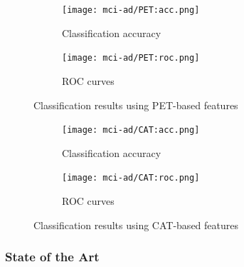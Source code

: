 \documentclass[12pt,a4paper]{article}
\begin{document}
\begin{figure}[H]
  \centering
  \begin{subfigure}[h]{0.49\textwidth}
    \texttt{[image: mci-ad/PET:acc.png]}
    \caption{Classification accuracy}  
  \end{subfigure}
  \begin{subfigure}[h]{0.49\textwidth}
    \texttt{[image: mci-ad/PET:roc.png]}
    \caption{ROC curves}  
  \end{subfigure}
  \caption{Classification results using PET-based features}
\end{figure}

\begin{figure}[H]
  \centering
  \begin{subfigure}[h]{0.49\textwidth}
    \texttt{[image: mci-ad/CAT:acc.png]}
    \caption{Classification accuracy}  
  \end{subfigure}
  \begin{subfigure}[h]{0.49\textwidth}
    \texttt{[image: mci-ad/CAT:roc.png]}
    \caption{ROC curves}  
  \end{subfigure}
  \caption{Classification results using CAT-based features}
\end{figure}

\subsubsection{State of the Art}
\label{sec:mci-ad-soa}
\end{document}
